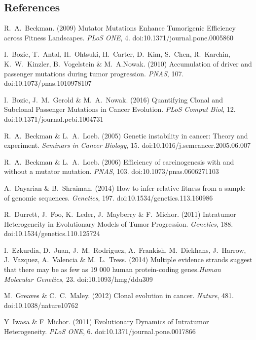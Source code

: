 \documentclass[a4paper]{article}
\begin{document}
\begin{multicols}{2}
\section{References}
\renewcommand{\section}[2]{}%
\begin{thebibliography}{}
	R.~A.~Beckman. (2009) Mutator Mutations Enhance Tumorigenic Efficiency across Fitness Landscapes. {\em PLoS ONE}, 4. doi:10.1371/journal.pone.0005860
	
	I.~Bozic, T.~Antal, H.~Ohtsuki, H.~Carter, D.~Kim, S.~Chen, R.~Karchin, K.~W.~Kinzler, B.~Vogelstein \& M.~A.Nowak. (2010) Accumulation of driver and passenger mutations during tumor progression. {\em PNAS}, 107. doi:10.1073/pnas.1010978107 
	
	I.~Bozic, J.~M.~Gerold \& M.~A.~Nowak. (2016) Quantifying Clonal and Subclonal Passenger Mutations in Cancer Evolution. {\em PLoS Comput Biol}, 12. doi:10.1371/journal.pcbi.1004731	 

	 R.~A.~Beckman \& L.~A.~Loeb. (2005) Genetic instability in cancer: Theory and experiment. {\em Seminars in Cancer Biology}, 15. doi:10.1016/j.semcancer.2005.06.007	
	
	 R.~A.~Beckman \& L.~A.~Loeb. (2006) Efficiency of carcinogenesis with and without a mutator mutation. {\em PNAS}, 103. doi:10.1073/pnas.0606271103		
	
	A.~Dayarian \& B.~Shraiman. (2014) How to infer relative fitness from a sample of genomic sequences. {\em Genetics}, 197. doi:10.1534/genetics.113.160986 	 	
	
	R.~Durrett, J.~Foo, K.~Leder, J.~Mayberry \& F.~Michor. (2011) Intratumor Heterogeneity in Evolutionary Models of Tumor Progression. {\em Genetics}, 188. doi:10.1534/genetics.110.125724
	
	I.~Ezkurdia, D.~Juan, J.~M.~Rodriguez, A.~Frankish, M.~Diekhans, J.~Harrow, J.~Vazquez, A.~Valencia \& M.~L.~Tress. (2014) Multiple evidence strands suggest that there may be as few as 19 000 human protein-coding genes.{\em Human Molecular Genetics}, 23. doi:10.1093/hmg/ddu309
	
	M.~Greaves \& C.~C.~Maley. (2012) Clonal evolution in cancer. {\em Nature}, 481. doi:10.1038/nature10762
	
	Y~Iwasa \& F~Michor. (2011) Evolutionary Dynamics of Intratumor Heterogeneity. {\em PLoS ONE}, 6. doi:10.1371/journal.pone.0017866
	

\end{thebibliography}
\end{multicols}
\end{document}
